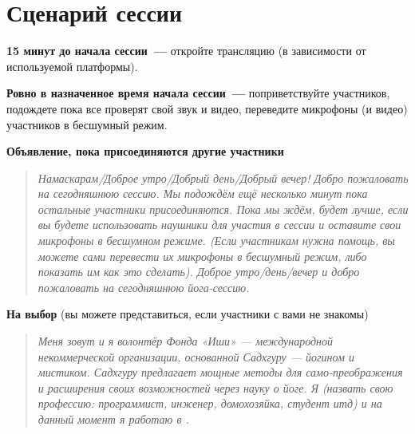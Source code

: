 \newpage
\section*{Сценарий сессии}
\label{sec:plan}

\textbf{15 минут до начала сессии~---} откройте трансляцию (в зависимости от используемой платформы). 

\textbf{Ровно в назначенное время начала сессии~---} поприветствуйте участников, подождете пока все проверят свой звук и видео, переведите микрофоны (и видео) участников в бесшумный режим.

\textbf{Объявление, пока присоединяются другие участники}
\begin{quote}\emph{
Намаскарам/Доброе утро/Добрый день/Добрый вечер!
Добро пожаловать на сегодняшнюю сессию. Мы подождём ещё несколько
минут пока остальные участники присоединяются. Пока мы ждём, будет
лучше, если вы будете использовать наушники для участия в сессии и
оставите свои микрофоны в бесшумном режиме. (Если участникам нужна
помощь, вы можете сами перевести их микрофоны в бесшумный режим,
либо показать им как это сделать).
Доброе утро/день/вечер и добро пожаловать на сегодняшнюю
йога-сессию.
}\end{quote}

\textbf{На выбор} (вы можете представиться, если участники с вами не знакомы)
\begin{quote}\emph{
Меня зовут \underline{\qquad} и я волонтёр Фонда «Иши» — международной
некоммерческой организации, основанной Садхгуру — йогином и
мистиком. Садхгуру предлагает мощные методы для само-преображения и
расширения своих возможностей через науку о йоге.
Я (назвать свою профессию: программист, инженер, домохозяйка, студент
итд) и на данный момент я работаю в \underline{\qquad}.
}\end{quote}

